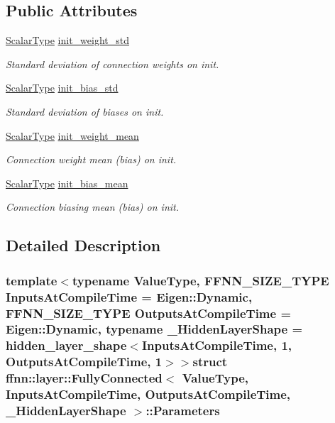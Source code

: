 \subsection*{Public Attributes}
\begin{DoxyCompactItemize}
\item 
\hyperlink{classffnn_1_1layer_1_1_fully_connected_aa5e1875ec3ea63c90655419e7dd32a55}{Scalar\-Type} \hyperlink{structffnn_1_1layer_1_1_fully_connected_1_1_parameters_a9f74c8450bd5a7c86a3d03bd3512b6a5}{init\-\_\-weight\-\_\-std}
\begin{DoxyCompactList}\small\item\em Standard deviation of connection weights on init. \end{DoxyCompactList}\item 
\hyperlink{classffnn_1_1layer_1_1_fully_connected_aa5e1875ec3ea63c90655419e7dd32a55}{Scalar\-Type} \hyperlink{structffnn_1_1layer_1_1_fully_connected_1_1_parameters_a25bc897be3defed5329b1df1111c0ace}{init\-\_\-bias\-\_\-std}
\begin{DoxyCompactList}\small\item\em Standard deviation of biases on init. \end{DoxyCompactList}\item 
\hyperlink{classffnn_1_1layer_1_1_fully_connected_aa5e1875ec3ea63c90655419e7dd32a55}{Scalar\-Type} \hyperlink{structffnn_1_1layer_1_1_fully_connected_1_1_parameters_a414ae4bbd3a061eb3b1a63bc77986f95}{init\-\_\-weight\-\_\-mean}
\begin{DoxyCompactList}\small\item\em Connection weight mean (bias) on init. \end{DoxyCompactList}\item 
\hyperlink{classffnn_1_1layer_1_1_fully_connected_aa5e1875ec3ea63c90655419e7dd32a55}{Scalar\-Type} \hyperlink{structffnn_1_1layer_1_1_fully_connected_1_1_parameters_ae41af8fbdeadb550592c9c87fa1c3e91}{init\-\_\-bias\-\_\-mean}
\begin{DoxyCompactList}\small\item\em Connection biasing mean (bias) on init. \end{DoxyCompactList}\end{DoxyCompactItemize}


\subsection{Detailed Description}
\subsubsection*{template$<$typename Value\-Type, F\-F\-N\-N\-\_\-\-S\-I\-Z\-E\-\_\-\-T\-Y\-P\-E Inputs\-At\-Compile\-Time = Eigen\-::\-Dynamic, F\-F\-N\-N\-\_\-\-S\-I\-Z\-E\-\_\-\-T\-Y\-P\-E Outputs\-At\-Compile\-Time = Eigen\-::\-Dynamic, typename \-\_\-\-Hidden\-Layer\-Shape = hidden\-\_\-layer\-\_\-shape$<$\-Inputs\-At\-Compile\-Time, 1, Outputs\-At\-Compile\-Time, 1$>$$>$struct ffnn\-::layer\-::\-Fully\-Connected$<$ Value\-Type, Inputs\-At\-Compile\-Time, Outputs\-At\-Compile\-Time, \-\_\-\-Hidden\-Layer\-Shape $>$\-::\-Parameters}

